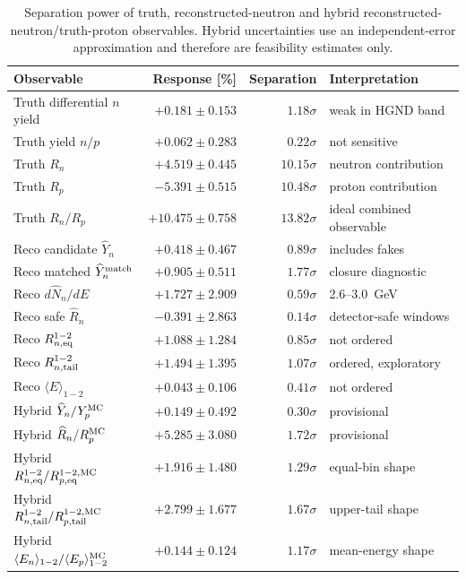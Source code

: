 \documentclass[11pt,a4paper]{article}
\begin{document}
\begin{table}[htbp]
\centering
\small
\begin{tabular}{lrrl}
\toprule
Observable & Response [\%] & Separation & Interpretation \\
\midrule
Truth differential $n$ yield & $+0.181\pm0.153$ & $1.18\sigma$ & weak in HGND band \\
Truth yield $n/p$ & $+0.062\pm0.283$ & $0.22\sigma$ & not sensitive \\
Truth $R_n$ & $+4.519\pm0.445$ & $10.15\sigma$ & neutron contribution \\
Truth $R_p$ & $-5.391\pm0.515$ & $10.48\sigma$ & proton contribution \\
Truth $R_n/R_p$ & $+10.475\pm0.758$ & $13.82\sigma$ & ideal combined observable \\
Reco candidate $\widehat Y_n$ & $+0.418\pm0.467$ & $0.89\sigma$ & includes fakes \\
Reco matched $\widehat Y_n^{\rm match}$ & $+0.905\pm0.511$ & $1.77\sigma$ & closure diagnostic \\
Reco $d\widehat N_n/dE$ & $+1.727\pm2.909$ & $0.59\sigma$ & 2.6--3.0~GeV \\
Reco safe $\widehat R_n$ & $-0.391\pm2.863$ & $0.14\sigma$ & detector-safe windows \\
Reco $R_{n,{\rm eq}}^{1-2}$ & $+1.088\pm1.284$ & $0.85\sigma$ & not ordered \\
Reco $R_{n,{\rm tail}}^{1-2}$ & $+1.494\pm1.395$ & $1.07\sigma$ & ordered, exploratory \\
Reco $\langle E\rangle_{1-2}$ & $+0.043\pm0.106$ & $0.41\sigma$ & not ordered \\
Hybrid $\widehat Y_n/Y_p^{\rm MC}$ & $+0.149\pm0.492$ & $0.30\sigma$ & provisional \\
Hybrid $\widehat R_n/R_p^{\rm MC}$ & $+5.285\pm3.080$ & $1.72\sigma$ & provisional \\
Hybrid $R_{n,{\rm eq}}^{1-2}/R_{p,{\rm eq}}^{1-2,{\rm MC}}$ & $+1.916\pm1.480$ & $1.29\sigma$ & equal-bin shape \\
Hybrid $R_{n,{\rm tail}}^{1-2}/R_{p,{\rm tail}}^{1-2,{\rm MC}}$ & $+2.799\pm1.677$ & $1.67\sigma$ & upper-tail shape \\
Hybrid $\langle E_n\rangle_{1-2}/\langle E_p\rangle_{1-2}^{\rm MC}$ & $+0.144\pm0.124$ & $1.17\sigma$ & mean-energy shape \\
\bottomrule
\end{tabular}
\caption{Separation power of truth, reconstructed-neutron and hybrid
reconstructed-neutron/truth-proton observables.  Hybrid uncertainties use an
independent-error approximation and therefore are feasibility estimates only.}
\label{tab:separation}
\end{table}
\end{document}

